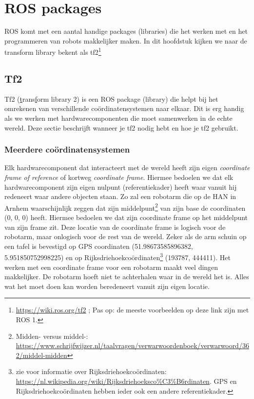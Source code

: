 \chapter{ROS packages}
ROS komt met een aantal handige packages (libraries) die het werken met en het programmeren van robots makkelijker maken. In dit hoofdstuk kijken we naar de transform library bekent als tf2\footnote{\url{https://wiki.ros.org/tf2} ; Pas op: de meeste voorbeelden op deze link zijn met ROS 1.}

\section{Tf2}
Tf2  (\underline{t}rans\underline{f}orm library 2) is een ROS package (library) die helpt bij het omrekenen van verschillende coördinatensystemen naar elkaar. Dit is erg handig als we werken met hardwarecomponenten die moet samenwerken in de echte wereld. Deze sectie beschrijft wanneer je tf2 nodig hebt en hoe je tf2 gebruikt.

\subsection{Meerdere coördinatensystemen}
Elk hardwarecomponent dat interacteert met de wereld heeft zijn eigen \textit{coordinate frame of reference} of kortweg \textit{coordinate frame}. Hiermee bedoelen we dat elk hardwarecomponent zijn eigen nulpunt (referentiekader) heeft waar vanuit hij redeneert waar andere objecten staan. Zo zal een robotarm die op de HAN in Arnhem waarschijnlijk zeggen dat zijn middelpunt\footnote{Midden- versus middel-: \url{https://www.schrijfwijzer.nl/taalvragen/verwarwoordenboek/verwarwoord/362/middel-midden}} van zijn base de coordinaten (0, 0, 0) heeft. Hiermee bedoelen we dat zijn coordinate frame op het middelpunt van zijn frame zit. Deze locatie van de coordinate frame is logisch voor de robotarm, maar onlogisch voor de rest van de wereld. Zeker als de arm schuin op een tafel is bevestigd op GPS coordinaten (51.98673585896382, 5.951850752998225) en op Rijksdriehoekcoördinaten\footnote{zie voor informatie over Rijksdriehoekcoördinaten: \url{https://nl.wikipedia.org/wiki/Rijksdriehoeksco\%C3\%B6rdinaten}. GPS en Rijksdriehoekcoördinaten hebben ieder ook een andere referentiekader.} (193787, 444411). Het werken met een coordinate frame voor een robotarm maakt veel dingen makkelijker. De robotarm hoeft niet te achterhalen waar in de wereld het is. Alles wat het moet doen kan worden beredeneert vanuit zijn eigen locatie. 

